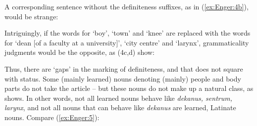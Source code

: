 \documentclass[output=paper]{langsci/langscibook}
\begin{document}
\begin{exe}
\label{ex:Enger:4a} 
\z

A corresponding sentence without the definiteness suffixes, as in (\ref{ex:Enger:4b}),
would be strange:

\z

Intriguingly, if the words for `boy', `town' and `knee' are replaced
with the words for `dean {[}of a faculty at a university{]}', `city
centre' and `larynx', grammaticality judgments would be the opposite, as
(4c,d) show:

\ea
\begin{xlist}
\label{ex:Enger:4c}
\z\z


Thus, there are `gaps' in the marking of definiteness, and that does not
square with  status. Some (mainly learned) nouns denoting (mainly)
people and body parts do not take the  article -- but these
nouns do not make up a natural class, as %
\citet{Lodrup16} %
%
shows. In other
words, not all learned nouns behave like \emph{dekanus, sentrum,
larynx}, and not all nouns that can behave like \emph{dekanus} are
learned, Latinate nouns. Compare (\ref{ex:Enger:5}):

\ea\label{ex:Enger:5}
\begin{xlist}
\label{ex:Enger:5a}


\end{xlist}
\end{xlist}
\end{exe}
\end{document}
